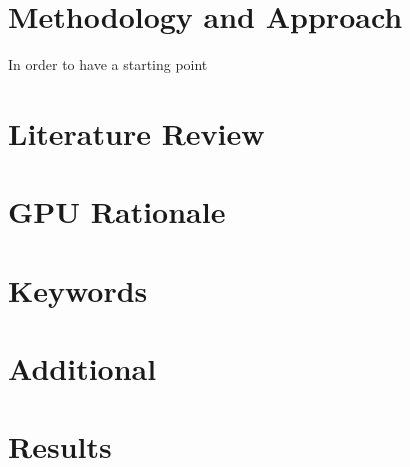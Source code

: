 \documentclass[paper=letter, fontsize=11pt]{scrartcl}
\numberwithin{equation}{section}		%
\numberwithin{figure}{section}			%
\numberwithin{table}{section}				%
\begin{document}
\begin{spacing}{2}
\section{Methodology and Approach}
In order to have a starting point \cite{class}
\section{Literature Review}
\section{GPU Rationale}
\section{Keywords}
\section{Additional}
\section{Results}



\end{spacing}

 
\end{document}
